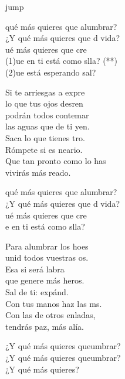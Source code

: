 \begin{cancion}jump\\
	\begin{chorus}%
		 qué más quieres que alumbrar?\\
		¿Y qué más quieres que d vida?\\
		ué más quieres que cre \\
		(1)ue en ti está como slla? (**)\\
		(2)ue está esperando sal?\jump\\
	\end{chorus}%
	Si te arriesgas a expre \\
	lo que tus ojos desren\\
	podrán todos contemar\\
	las aguas que de ti yen.\\
	Saca lo que tienes tro. \\
	Rómpete si es neario.\\
	Que tan pronto como lo has \\
	vivirás más reado.\jump\\
	\begin{chorus}%
		 qué más quieres que alumbrar?\\
		¿Y qué más quieres que d vida?\\
		ué más quieres que cre \chord{(Re}{7)}{algo }\\
		e en ti está como slla?\jump\\
	\end{chorus}%
	Para alumbrar los hoes \\
	unid todos vuestras os.\\
	Esa si será labra\\
	que genere más heros.\\
	Sal de ti: expánd. \\
	Con tus manos haz las ms.\\
	Con las de otros enladas,\\
	tendrás paz, más alía.\jump\\
	\begin{chorus}%
		¿Y qué más quieres queumbrar?\\
		¿Y qué más quieres queumbrar?\\
	\jump
	¿Y qué más quieres?\jump\\
	\end{chorus}%
\end{cancion}%
